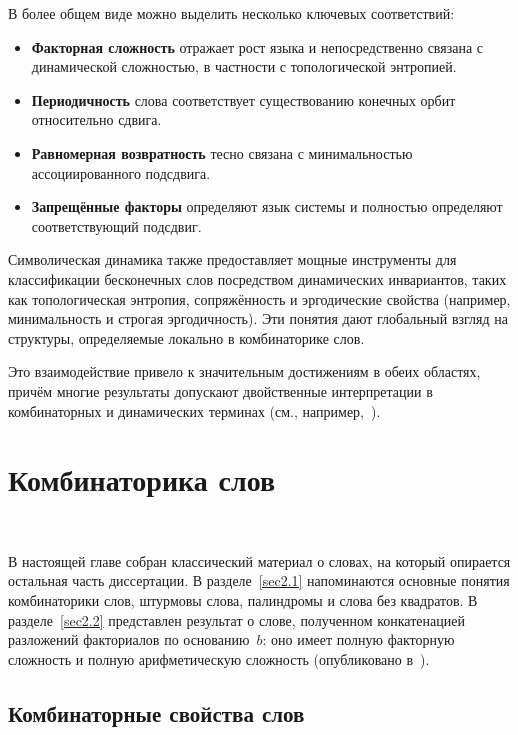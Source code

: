 \documentclass[a4paper,14pt]{extreport}
\theoremstyle{plain}
\theoremstyle{definition}
\theoremstyle{remark}
\begin{document}
В более общем виде можно выделить несколько ключевых соответствий:
\begin{itemize}
	\item \textbf{Факторная сложность} отражает рост языка и непосредственно связана с динамической сложностью, в частности с топологической энтропией.
	\item \textbf{Периодичность} слова соответствует существованию конечных орбит относительно сдвига.
	\item \textbf{Равномерная возвратность} тесно связана с минимальностью ассоциированного подсдвига.
	\item \textbf{Запрещённые факторы} определяют язык системы и полностью определяют соответствующий подсдвиг.
\end{itemize}

Символическая динамика также предоставляет мощные инструменты для классификации бесконечных слов посредством динамических инвариантов, таких как топологическая энтропия, сопряжённость и эргодические свойства (например, минимальность и строгая эргодичность). Эти понятия дают глобальный взгляд на структуры, определяемые локально в комбинаторике слов.

Это взаимодействие привело к значительным достижениям в обеих областях, причём многие результаты допускают двойственные интерпретации в комбинаторных и динамических терминах (см., например,~\cite{Lothaire2002, Allouche}).
\chapter{Комбинаторика слов}~\label{sec2}

В настоящей главе собран классический материал о словах, на который опирается остальная часть диссертации. В разделе~\ref{sec2.1} напоминаются основные понятия комбинаторики слов, штурмовы слова, палиндромы и слова без квадратов. В разделе~\ref{sec2.2} представлен результат о слове, полученном конкатенацией разложений факториалов по основанию~$b$: оно имеет полную факторную сложность и полную арифметическую сложность (опубликовано в~\cite{Duaa23}).

\section{Комбинаторные свойства слов}~\label{sec2.1}
\end{document}
